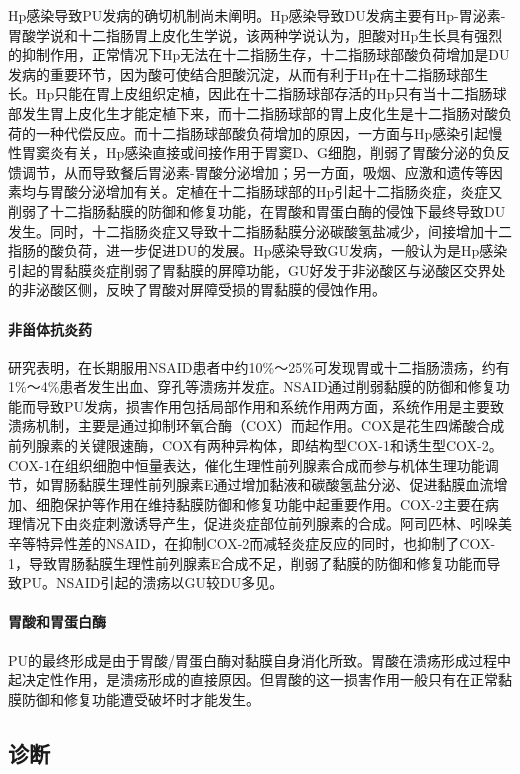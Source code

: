 Hp感染导致PU发病的确切机制尚未阐明。Hp感染导致DU发病主要有Hp-胃泌素-胃酸学说和十二指肠胃上皮化生学说，该两种学说认为，胆酸对Hp生长具有强烈的抑制作用，正常情况下Hp无法在十二指肠生存，十二指肠球部酸负荷增加是DU发病的重要环节，因为酸可使结合胆酸沉淀，从而有利于Hp在十二指肠球部生长。Hp只能在胃上皮组织定植，因此在十二指肠球部存活的Hp只有当十二指肠球部发生胃上皮化生才能定植下来，而十二指肠球部的胃上皮化生是十二指肠对酸负荷的一种代偿反应。而十二指肠球部酸负荷增加的原因，一方面与Hp感染引起慢性胃窦炎有关，Hp感染直接或间接作用于胃窦D、G细胞，削弱了胃酸分泌的负反馈调节，从而导致餐后胃泌素-胃酸分泌增加；另一方面，吸烟、应激和遗传等因素均与胃酸分泌增加有关。定植在十二指肠球部的Hp引起十二指肠炎症，炎症又削弱了十二指肠黏膜的防御和修复功能，在胃酸和胃蛋白酶的侵蚀下最终导致DU发生。同时，十二指肠炎症又导致十二指肠黏膜分泌碳酸氢盐减少，间接增加十二指肠的酸负荷，进一步促进DU的发展。Hp感染导致GU发病，一般认为是Hp感染引起的胃黏膜炎症削弱了胃黏膜的屏障功能，GU好发于非泌酸区与泌酸区交界处的非泌酸区侧，反映了胃酸对屏障受损的胃黏膜的侵蚀作用。

\paragraph{非甾体抗炎药}

研究表明，在长期服用NSAID患者中约10\%～25\%可发现胃或十二指肠溃疡，约有1\%～4\%患者发生出血、穿孔等溃疡并发症。NSAID通过削弱黏膜的防御和修复功能而导致PU发病，损害作用包括局部作用和系统作用两方面，系统作用是主要致溃疡机制，主要是通过抑制环氧合酶（COX）而起作用。COX是花生四烯酸合成前列腺素的关键限速酶，COX有两种异构体，即结构型COX-1和诱生型COX-2。COX-1在组织细胞中恒量表达，催化生理性前列腺素合成而参与机体生理功能调节，如胃肠黏膜生理性前列腺素E通过增加黏液和碳酸氢盐分泌、促进黏膜血流增加、细胞保护等作用在维持黏膜防御和修复功能中起重要作用。COX-2主要在病理情况下由炎症刺激诱导产生，促进炎症部位前列腺素的合成。阿司匹林、吲哚美辛等特异性差的NSAID，在抑制COX-2而减轻炎症反应的同时，也抑制了COX-1，导致胃肠黏膜生理性前列腺素E合成不足，削弱了黏膜的防御和修复功能而导致PU。NSAID引起的溃疡以GU较DU多见。

\paragraph{胃酸和胃蛋白酶}

PU的最终形成是由于胃酸/胃蛋白酶对黏膜自身消化所致。胃酸在溃疡形成过程中起决定性作用，是溃疡形成的直接原因。但胃酸的这一损害作用一般只有在正常黏膜防御和修复功能遭受破坏时才能发生。

\subsection{诊断}

